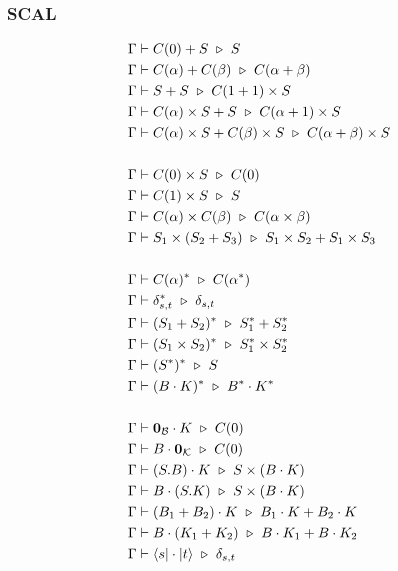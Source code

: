\subsubsection*{\textsf{SCAL}}
\begin{align*}
  & \Gamma \vdash C(0) + S \reduce S \\
  & \Gamma \vdash C(\alpha) + C(\beta) \reduce C(\alpha + \beta) \\
  & \Gamma \vdash S + S \reduce C(1 + 1) \times S \\
  & \Gamma \vdash C(\alpha) \times S + S \reduce C(\alpha + 1) \times S \\
  & \Gamma \vdash C(\alpha) \times S + C(\beta) \times S \reduce C(\alpha + \beta) \times S \\
  \\
  & \Gamma \vdash C(0) \times S \reduce C(0) \\
  & \Gamma \vdash C(1) \times S \reduce S \\
  & \Gamma \vdash C(\alpha) \times C(\beta) \reduce C(\alpha \times \beta) \\
  & \Gamma \vdash S_1 \times (S_2 + S_3) \reduce S_1 \times S_2 + S_1 \times S_3\\
  \\
  & \Gamma \vdash C(\alpha)^* \reduce C(\alpha^*) \\
  & \Gamma \vdash \delta_{s, t}^* \reduce \delta_{s, t} \\
  & \Gamma \vdash (S_1 + S_2)^* \reduce S_1^* + S_2^* \\
  & \Gamma \vdash (S_1 \times S_2)^* \reduce S_1^* \times S_2^* \\
  & \Gamma \vdash (S^*)^* \reduce S \\
  & \Gamma \vdash (B \cdot K)^* \reduce B^* \cdot K^* \\
  \\
  & \Gamma \vdash \mathbf{0}_\mathcal{B} \cdot K \reduce C(0) \\
  & \Gamma \vdash B \cdot \mathbf{0}_\mathcal{K} \reduce C(0) \\
  & \Gamma \vdash (S.B) \cdot K \reduce S \times (B \cdot K) \\
  & \Gamma \vdash B \cdot (S.K) \reduce S \times (B \cdot K) \\
  & \Gamma \vdash (B_1 + B_2) \cdot K \reduce B_1 \cdot K + B_2 \cdot K \\
  & \Gamma \vdash B \cdot (K_1 + K_2) \reduce B \cdot K_1 + B \cdot K_2 \\
  & \Gamma \vdash \bra{s} \cdot \ket{t} \reduce \delta_{s, t} \\

\end{align*}
